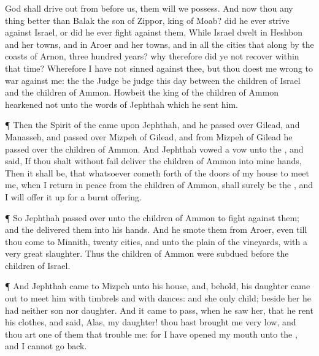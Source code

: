 {God shall drive
out from
before us, them will we
possess.
And now
{} thou any thing
better than
Balak the
son of
Zippor,
king of
Moab? did he
ever
strive against
Israel, or did he
ever
fight against them,
While
Israel
dwelt in
Heshbon and her
towns, and in
Aroer and her
towns, and in all the
cities that
{} along by the
coasts of
Arnon,
three
hundred
years? why therefore did ye not
recover
{} within that
time?
Wherefore I have not
sinned against thee, but thou
doest me
wrong to
war against me: the
{} the
Judge be
judge this
day between the
children of
Israel and the
children of
Ammon.
Howbeit the
king of the
children of
Ammon
hearkened not unto the
words of
Jephthah which he
sent him.
\par }{\PP {}¶ Then the
Spirit of the
{} came upon
Jephthah, and he passed
over
Gilead, and
Manasseh, and passed
over
Mizpeh of
Gilead, and from
Mizpeh of
Gilead he passed
over
{} the
children of
Ammon.
And
Jephthah
vowed a
vow unto the
{}, and
said, If thou shalt without
fail
deliver the
children of
Ammon into mine
hands,
Then it shall be, that
whatsoever cometh
forth of the
doors of my
house to
meet me, when I
return in
peace from the
children of
Ammon, shall surely be the
{}, and I will offer it
up for a burnt
offering.
\par }{\PP {}¶ So
Jephthah passed
over unto the
children of
Ammon to
fight against them; and the
{}
delivered them into his
hands.
And he
smote them from
Aroer, even till thou
come to
Minnith,
{}
twenty
cities, and unto the
plain of the
vineyards, with a
very
great
slaughter. Thus the
children of
Ammon were
subdued
before the
children of
Israel.
\par }{\PP {}¶ And
Jephthah
came to
Mizpeh unto his
house, and, behold, his
daughter came
out to
meet him with
timbrels and with
dances: and she
{} only
child; beside her he had neither
son
nor
daughter.
And it came to pass, when he
saw her, that he
rent his
clothes, and
said,
Alas, my
daughter! thou hast
brought me
very
low, and thou art one of them that
trouble me: for I have
opened my
mouth unto the
{}, and I
cannot go
back.
}
